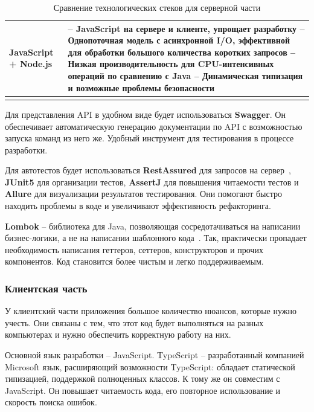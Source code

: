 \documentclass[a4paper,article]{article}
\begin{document}
\begin{sloppypar}
\begin{xltabular}{\textwidth} { |
        >{\hsize} X |
        >{\hsize} X | }
        \hline
        JavaScript + Node.js
        & -- JavaScript на сервере и клиенте, упрощает разработку \newline -- Однопоточная модель с асинхронной I/O, эффективной для обработки большого количества коротких запросов \newline -- Низкая производительность для CPU-интенсивных операций по сравнению с Java \newline -- Динамическая типизация и возможные проблемы безопасности \\

        \hline

        \caption{\centering Сравнение технологических стеков для серверной части}

        \label{tab:Сравнение технологических стеков для серверной части}
    \end{xltabular}

    Для представления API в удобном виде будет использоваться \textbf{Swagger}. Он обеспечивает автоматическую генерацию документации по API с возможностью запуска команд из него же. Удобный инструмент для тестирования в процессе разработки.

    Для автотестов будет использоваться \textbf{RestAssured} для запросов на сервер~\cite{restassured}, \textbf{JUnit5} для организации тестов, \textbf{AssertJ} для повышения читаемости тестов и \textbf{Allure} для визуализации результатов тестирования. Они помогают быстро находить проблемы в коде и увеличивают эффективность рефакторинга.

    \textbf{Lombok} -- библиотека для Java, позволяющая сосредотачиваться на написании бизнес-логики, а не на написании шаблонного кода~\cite{lombok}. Так, практически пропадает необходимость написания геттеров, сеттеров, конструкторов и прочих компонентов. Код становится более чистым и легко поддерживаемым.

    \subsubsection{Клиентская часть}\label{Реализация. Выбор. Клиентская часть}

    У клиентский части приложения большое количество нюансов, которые нужно учесть. Они связаны с тем, что этот код будет выполняться на разных компьютерах и нужно обеспечить корректную работу на них.

    Основной язык разработки -- JavaScript. TypeScript -- разработанный компанией Microsoft язык, расширяющий возможности TypeScript: обладает статической типизацией, поддержкой полноценных классов. К тому же он совместим с JavaScript. Он повышает читаемость кода, его повторное использование и скорость поиска ошибок.


\end{sloppypar}
\end{document}
